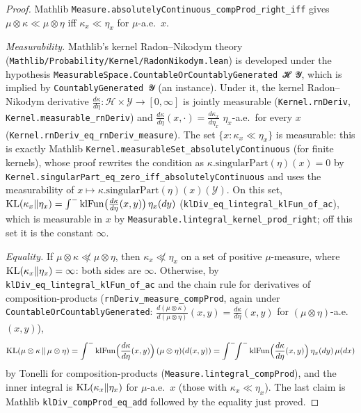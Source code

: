 \begin{proof}
\leanok
Mathlib \texttt{Measure.absolutelyContinuous\_compProd\_right\_iff} gives
$\mu\otimes\kappa \ll \mu\otimes\eta$ iff $\kappa_x \ll \eta_x$ for $\mu$-a.e.\ $x$.

\emph{Measurability.} Mathlib's kernel Radon--Nikodym theory
(\texttt{Mathlib/Probability/Kernel/RadonNikodym.lean}) is developed under the hypothesis
\texttt{MeasurableSpace.CountableOrCountablyGenerated 𝓗 𝓨}, which is implied by
\texttt{CountablyGenerated 𝓨} (an instance). Under it, the kernel Radon--Nikodym
derivative $\frac{d\kappa}{d\eta} : \mathcal{H}\times\mathcal{Y}\to[0,\infty]$ is jointly
measurable (\texttt{Kernel.rnDeriv}, \texttt{Kernel.measurable\_rnDeriv}) and
$\frac{d\kappa}{d\eta}(x,\cdot) = \frac{d\kappa_x}{d\eta_x}$ $\eta_x$-a.e.\ for every $x$
(\texttt{Kernel.rnDeriv\_eq\_rnDeriv\_measure}). The set $\{x : \kappa_x \ll \eta_x\}$ is
measurable: this is exactly Mathlib \texttt{Kernel.measurableSet\_absolutelyContinuous} (for
finite kernels), whose proof rewrites the condition as
$\kappa.\mathrm{singularPart}(\eta)(x) = 0$ by
\texttt{Kernel.singularPart\_eq\_zero\_iff\_absolutelyContinuous} and uses the measurability
of $x \mapsto \kappa.\mathrm{singularPart}(\eta)(x)(\mathcal{Y})$. On this set,
$\mathrm{KL}(\kappa_x\|\eta_x) = \int^-\mathrm{klFun}\big(\tfrac{d\kappa}{d\eta}(x,y)\big)\,\eta_x(dy)$
(\texttt{klDiv\_eq\_lintegral\_klFun\_of\_ac}), which is measurable in $x$ by
\texttt{Measurable.lintegral\_kernel\_prod\_right}; off this set it is the constant $\infty$.

\emph{Equality.} If $\mu\otimes\kappa \not\ll \mu\otimes\eta$, then $\kappa_x\not\ll\eta_x$ on a
set of positive $\mu$-measure, where $\mathrm{KL}(\kappa_x\|\eta_x) = \infty$: both sides are $\infty$.
Otherwise, by \texttt{klDiv\_eq\_lintegral\_klFun\_of\_ac} and the chain rule for derivatives
of composition-products (\texttt{rnDeriv\_measure\_compProd}, again under
\texttt{CountableOrCountablyGenerated}:
$\frac{d(\mu\otimes\kappa)}{d(\mu\otimes\eta)}(x,y) = \frac{d\kappa}{d\eta}(x,y)$ for
$(\mu\otimes\eta)$-a.e.\ $(x,y)$),
\[
  \mathrm{KL}(\mu\otimes\kappa\,\|\,\mu\otimes\eta)
  = \int^- \mathrm{klFun}\Big(\frac{d\kappa}{d\eta}(x,y)\Big)\,(\mu\otimes\eta)(d(x,y))
  = \int^-\!\!\int^- \mathrm{klFun}\Big(\frac{d\kappa}{d\eta}(x,y)\Big)\,\eta_x(dy)\,\mu(dx)
\]
by Tonelli for composition-products (\texttt{Measure.lintegral\_compProd}), and the inner
integral is $\mathrm{KL}(\kappa_x\|\eta_x)$ for $\mu$-a.e.\ $x$ (those with $\kappa_x\ll\eta_x$). The
last claim is Mathlib \texttt{klDiv\_compProd\_eq\_add} followed by the equality just proved.
\end{proof}

